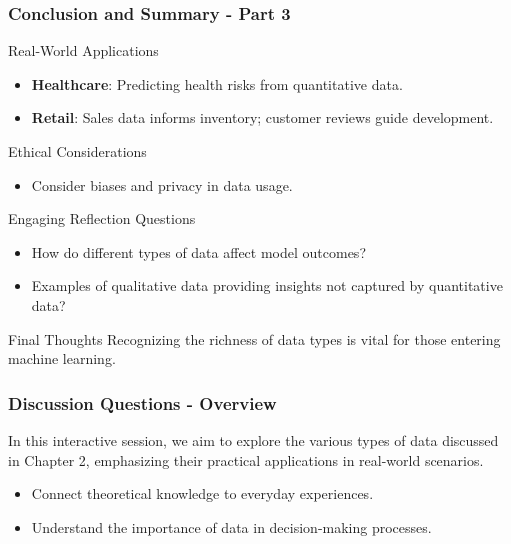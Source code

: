 \documentclass[aspectratio=169]{beamer}
\begin{document}
\begin{frame}[fragile]
    \frametitle{Conclusion and Summary - Part 3}
    \begin{block}{Real-World Applications}
        \begin{itemize}
            \item \textbf{Healthcare}: Predicting health risks from quantitative data.
            \item \textbf{Retail}: Sales data informs inventory; customer reviews guide development.
        \end{itemize}
    \end{block}

    \begin{block}{Ethical Considerations}
        \begin{itemize}
            \item Consider biases and privacy in data usage.
        \end{itemize}
    \end{block}
    
    \begin{block}{Engaging Reflection Questions}
        \begin{itemize}
            \item How do different types of data affect model outcomes?
            \item Examples of qualitative data providing insights not captured by quantitative data?
        \end{itemize}
    \end{block}
    
    \begin{block}{Final Thoughts}
        Recognizing the richness of data types is vital for those entering machine learning.
    \end{block}
\end{frame}

\begin{frame}[fragile]
    \frametitle{Discussion Questions - Overview}
    In this interactive session, we aim to explore the various types of data discussed in Chapter 2, emphasizing their practical applications in real-world scenarios. 
    \begin{itemize}
        \item Connect theoretical knowledge to everyday experiences.
        \item Understand the importance of data in decision-making processes.
    \end{itemize}
\end{frame}
\end{document}

